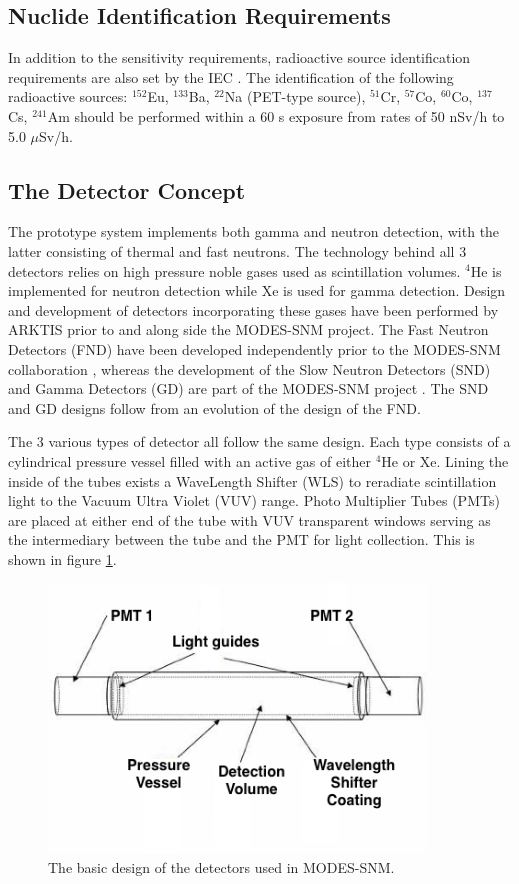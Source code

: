 \subsection{Nuclide Identification Requirements}
In addition to the sensitivity requirements, radioactive source identification requirements are also set by the IEC \cite{IEC62244}. The identification of the following radioactive sources: $^{152}$Eu, $^{133}$Ba, $^{22}$Na (PET-type source), $^{51}$Cr, $^{57}$Co, $^{60}$Co, $^{137}$Cs, $^{241}$Am should be performed within a 60 s exposure from rates of 50 nSv/h to 5.0 $\mu$Sv/h.

\subsection{The Detector Concept}
The prototype system implements both gamma and neutron detection, with the latter consisting of thermal and fast neutrons. The technology behind all 3 detectors relies on high pressure noble gases used as scintillation volumes. $^{4}$He is implemented for neutron detection while Xe is used for gamma detection. Design and development of detectors incorporating these gases have been performed by ARKTIS prior to and along side the MODES-SNM project. The Fast Neutron Detectors (FND) have been developed independently prior to the MODES-SNM collaboration \cite{helium4Detectors}, whereas the development of the Slow Neutron Detectors (SND) and Gamma Detectors (GD) are part of the MODES-SNM project \cite{xenonScintDetectors}. The SND and GD designs follow from an evolution of the design of the FND. 

The 3 various types of detector all follow the same design. Each type consists of a cylindrical pressure vessel filled with an active gas of either $^{4}$He or Xe. Lining the inside of the tubes exists a WaveLength Shifter (WLS) to reradiate scintillation light to the Vacuum Ultra Violet (VUV) range. Photo Multiplier Tubes (PMTs) are placed at either end of the tube with VUV transparent windows serving as the intermediary between the tube and the PMT for light collection. This is shown in figure \ref{fig:detectorConcept}.

\begin{figure}[htbp]
\begin{center}
\includegraphics[width=100mm]{Chapter5/figures/neutronDetectorLabelled2.png}
\caption{The basic design of the detectors used in MODES-SNM.}
\label{fig:detectorConcept}
\end{center}
\end{figure}

